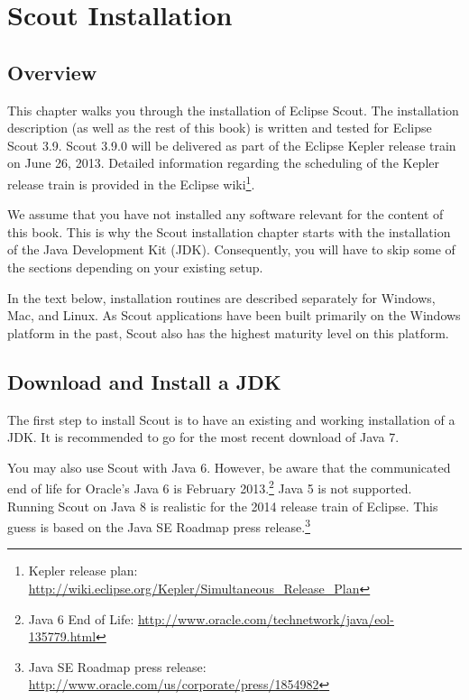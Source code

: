 \documentclass[a4paper,10pt,twoside]{book}
\begin{document}
  \sloppy
\fi


\chapter{Scout Installation}

\section{Overview}

This chapter walks you through the installation of Eclipse Scout. 
The installation description (as well as the rest of this book) is written and tested for Eclipse Scout 3.9.
Scout 3.9.0 will be delivered as part of the Eclipse Kepler release train on June 26, 2013.
Detailed information regarding the scheduling of the Kepler release train is provided in the Eclipse
wiki\footnote{Kepler release plan: \url{http://wiki.eclipse.org/Kepler/Simultaneous_Release_Plan}}.

We assume that you have not installed any software relevant for the content of this book.
This is why the Scout installation chapter starts with the installation of the Java Development Kit (JDK).
Consequently, you will have to skip some of the sections depending on your existing setup.

In the text below, installation routines are described separately for Windows, Mac, and Linux.
As Scout applications have been built primarily on the Windows platform in the past, Scout also has the highest maturity level on this platform.

\section{Download and Install a JDK}

The first step to install Scout is to have an existing and working installation of a JDK.
It is recommended to go for the most recent download of Java 7.

You may also use Scout with Java 6.
However, be aware that the communicated end of life for Oracle's Java 6 is February 
2013.\footnote{Java 6 End of Life: \url{http://www.oracle.com/technetwork/java/eol-135779.html}}
Java 5 is not supported. 
Running Scout on Java 8 is realistic for the 2014 release train of Eclipse.
This guess is based on the Java SE Roadmap press 
release.\footnote{Java SE Roadmap press release: \url{http://www.oracle.com/us/corporate/press/1854982}}
\end{document}
